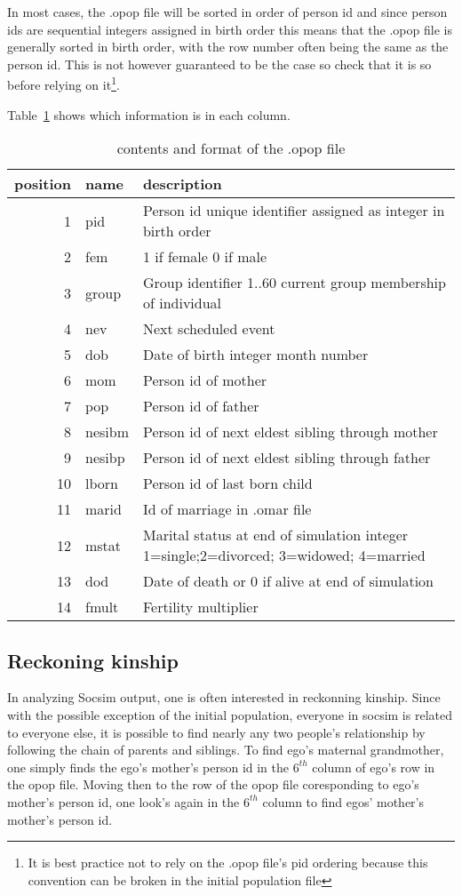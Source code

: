 In most cases, the .opop file will be sorted in order of person id and
since person ids are sequential integers assigned in birth order this
means that the .opop file is generally sorted in birth order, with the
row number often being the same as the person id. This is not
however guaranteed to be the case so check that it is so before
relying on it\footnote{It is best practice not to rely on the .opop
  file's pid ordering because this convention can be broken in the
  initial population file}.

Table~\ref{tab:opop} shows which information is in each column.
\begin{table}[h]
  \centering

  \begin{tabular*}{.8\textwidth}{||r| l |p{6cm} ||}
\hline
\textbf{position}&\textbf{name}&\textbf{description}\\
\hline \hline
1&pid & Person id unique identifier assigned as integer in birth order\\
2&fem & 1 if female 0 if male\\
3&group& Group identifier 1..60 current group membership of individual\\
4&nev & Next scheduled event \\
5&dob & Date of birth integer month number\\
6&mom & Person id of mother \\
7&pop & Person id  of father \\
8&nesibm & Person id of next eldest sibling through mother\\
9&nesibp & Person id  of next eldest sibling through father\\
10&lborn & Person id  of last born child\\
11&marid & Id of marriage in .omar file \\
12&mstat & Marital status at end of simulation integer 1=single;2=divorced;
          3=widowed; 4=married\\
13&dod & Date of death or 0 if alive at end of simulation\\
14&fmult & Fertility multiplier\\
    \hline
  \end{tabular*}
  \caption{contents and format of the .opop file}
  \label{tab:opop}
\end{table}

\subsection{Reckoning kinship}
In analyzing Socsim output, one is often interested in reckonning
kinship.  Since with the possible exception of the initial population,
everyone in socsim is related to everyone else, it is possible to find
nearly any two people's relationship by following the chain of parents
and siblings. To find ego's maternal grandmother, one simply finds the
ego's mother's person id in the $6^{th}$ column of ego's row in the
opop file. Moving then to the row of the opop file coresponding to
ego's mother's person id, one look's again in the $6^{th}$ column to
find egos' mother's mother's person id.

